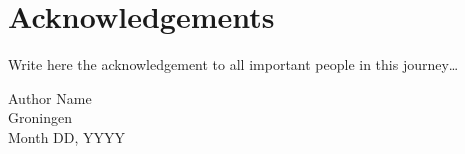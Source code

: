 \chapter*{Acknowledgements}
	
Write here the acknowledgement to all important people in this journey\dots 

\begin{flushright}
    Author Name\\
    Groningen\\
    Month DD, YYYY
\end{flushright}
